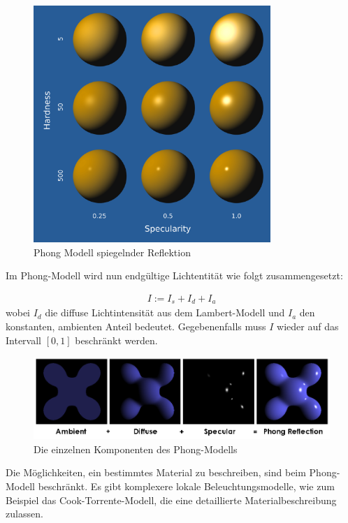 \begin{figure}[H]
    \centering
    \includegraphics[width=0.8\textwidth]{images/phong.png}
    \caption{Phong Modell spiegelnder Reflektion}
    \label{fig:reflection-phong-specular-model}
\end{figure}

Im Phong-Modell wird nun endgültige Lichtentität wie folgt zusammengesetzt:

\begin{align}
I := I_s + I_d + I_a
\end{align}
wobei $I_d$ die diffuse Lichtintensität aus dem Lambert-Modell und $I_a$ den konstanten, ambienten Anteil bedeutet.
Gegebenenfalls muss $I$ wieder auf das Intervall $[0,1]$ beschränkt werden.

\begin{figure}[H]
    \centering
    \includegraphics[width=1.0\textwidth]{images/Phong_Components.png}
    \caption{Die einzelnen Komponenten des Phong-Modells}
    \label{fig:phong-components}\end{figure}

Die Möglichkeiten, ein bestimmtes Material zu beschreiben, sind  beim Phong-Modell beschränkt. 
Es gibt komplexere lokale Beleuchtungsmodelle, wie zum Beispiel das Cook-Torrente-Modell, die eine detaillierte Materialbeschreibung zulassen.




